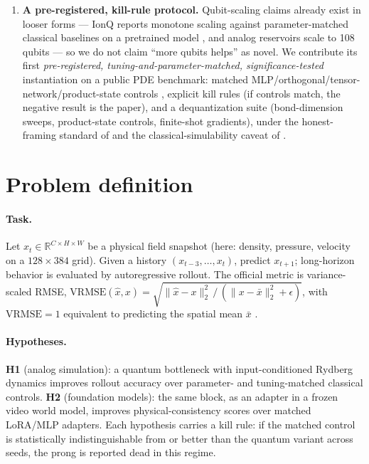 \documentclass{article}
\begin{document}
\begin{enumerate}
  quantum generators \citep{huang2020patchgan}.
  \item \textbf{A pre-registered, kill-rule protocol.} Qubit-scaling
  claims already exist in looser forms --- IonQ reports monotone scaling
  against parameter-matched classical baselines on a pretrained model
  \citep{ionq2026scaling}, and analog reservoirs scale to 108 qubits
  \citep{kornjaca2024aquila} --- so we do not claim ``more qubits helps''
  as novel. We contribute its first \emph{pre-registered,
  tuning-and-parameter-matched, significance-tested} instantiation on a
  public PDE benchmark: matched MLP/orthogonal/tensor-network/product-state
  controls \citep{pandey2026qrcbaselines,bowles2024better}, explicit kill
  rules (if controls match, the negative result is the paper), and a
  dequantization suite (bond-dimension sweeps, product-state controls,
  finite-shot gradients), under the honest-framing standard of
  \citet{schuld2022advantage} and the classical-simulability caveat of
  \citet{cerezo2025barren}.
\end{enumerate}

\section{Problem definition}
\label{sec:problem}

\paragraph{Task.} Let $x_t \in \mathbb{R}^{C \times H \times W}$ be a physical
field snapshot (here: density, pressure, velocity on a $128{\times}384$ grid).
Given a history $(x_{t-3},\dots,x_t)$, predict $x_{t+1}$; long-horizon
behavior is evaluated by autoregressive rollout. The official metric is
variance-scaled RMSE,
$\mathrm{VRMSE}(\hat x, x) = \sqrt{\|\hat x - x\|_2^2 \,/\,
(\|x - \bar x\|_2^2 + \epsilon)}$,
with $\mathrm{VRMSE}=1$ equivalent to predicting the spatial mean $\bar x$
\citep{ohana2024thewell}.

\paragraph{Hypotheses.}
\textbf{H1} (analog simulation): a quantum bottleneck with input-conditioned
Rydberg dynamics improves rollout accuracy over parameter- and tuning-matched
classical controls. \textbf{H2} (foundation models): the same block, as an
adapter in a frozen video world model, improves physical-consistency scores
over matched LoRA/MLP adapters. Each hypothesis carries a kill rule: if the
matched control is statistically indistinguishable from or better than the
quantum variant across seeds, the prong is reported dead in this regime.
\end{document}
